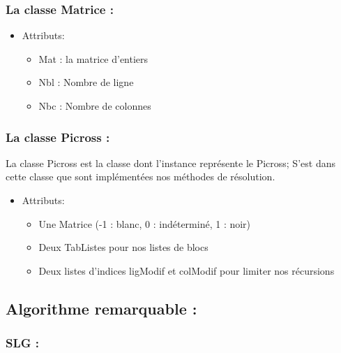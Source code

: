 \documentclass{article}
\begin{document}
\subsubsection{La classe Matrice :}
\begin{itemize}
\item Attributs:
\begin{itemize}
\item Mat : la matrice d'entiers
\item Nbl : Nombre de ligne
\item Nbc : Nombre de colonnes
\end{itemize}
\end{itemize}
\subsubsection{La classe Picross :}
La classe Picross est la classe dont l'instance représente le Picross; S'est dans cette classe que sont implémentées nos méthodes de résolution.
\begin{itemize}
\item Attributs:
\begin{itemize}
\item Une Matrice (-1 : blanc, 0 : indéterminé, 1 : noir)
\item Deux TabListes pour nos listes de blocs
\item Deux listes d'indices ligModif et colModif pour limiter nos récursions
\end{itemize}
\end{itemize}
\newpage
\subsection{Algorithme remarquable :}
\subsubsection{SLG :}
\end{document}
